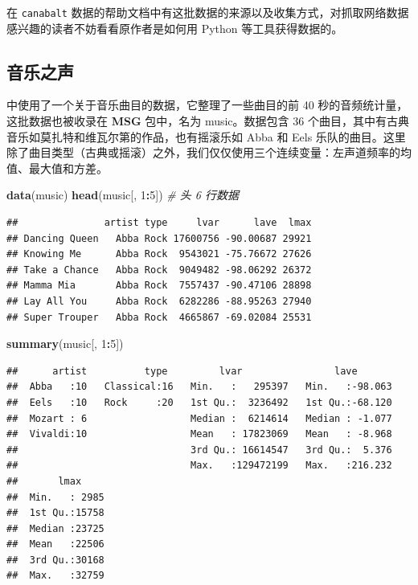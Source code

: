 \documentclass[
  b5paper,
  UTF8,twoside]{book}
\newenvironment{Shaded}{\begin{snugshade}}{\end{snugshade}}
\newcommand{\CommentTok}[1]{\textcolor[rgb]{0.56,0.35,0.01}{\textit{#1}}}
\newcommand{\DecValTok}[1]{\textcolor[rgb]{0.00,0.00,0.81}{#1}}
\newcommand{\FunctionTok}[1]{\textcolor[rgb]{0.13,0.29,0.53}{\textbf{#1}}}
\newcommand{\NormalTok}[1]{#1}
\newcommand{\SpecialCharTok}[1]{\textcolor[rgb]{0.81,0.36,0.00}{\textbf{#1}}}
\begin{document}
在 \texttt{canabalt} 数据的帮助文档中有这批数据的来源以及收集方式，对抓取网络数据感兴趣的读者不妨看看原作者是如何用 Python 等工具获得数据的。

\subsection{音乐之声}\label{subsec:music}

\citet{Cook07} 中使用了一个关于音乐曲目的数据，它整理了一些曲目的前 40 秒的音频统计量，这批数据也被收录在 \textbf{MSG} 包中，名为 music。数据包含 36 个曲目，其中有古典音乐如莫扎特和维瓦尔第的作品，也有摇滚乐如 Abba 和 Eels 乐队的曲目。这里除了曲目类型（古典或摇滚）之外，我们仅仅使用三个连续变量：左声道频率的均值、最大值和方差。

\begin{Shaded}
\begin{Highlighting}[]
\FunctionTok{data}\NormalTok{(music)}
\FunctionTok{head}\NormalTok{(music[, }\DecValTok{1}\SpecialCharTok{:}\DecValTok{5}\NormalTok{]) }\CommentTok{\# 头 6 行数据}
\end{Highlighting}
\end{Shaded}

\begin{verbatim}
##               artist type     lvar      lave  lmax
## Dancing Queen   Abba Rock 17600756 -90.00687 29921
## Knowing Me      Abba Rock  9543021 -75.76672 27626
## Take a Chance   Abba Rock  9049482 -98.06292 26372
## Mamma Mia       Abba Rock  7557437 -90.47106 28898
## Lay All You     Abba Rock  6282286 -88.95263 27940
## Super Trouper   Abba Rock  4665867 -69.02084 25531
\end{verbatim}

\begin{Shaded}
\begin{Highlighting}[]
\FunctionTok{summary}\NormalTok{(music[, }\DecValTok{1}\SpecialCharTok{:}\DecValTok{5}\NormalTok{])}
\end{Highlighting}
\end{Shaded}

\begin{verbatim}
##      artist          type         lvar                lave        
##  Abba   :10   Classical:16   Min.   :   295397   Min.   :-98.063  
##  Eels   :10   Rock     :20   1st Qu.:  3236492   1st Qu.:-68.120  
##  Mozart : 6                  Median :  6214614   Median : -1.077  
##  Vivaldi:10                  Mean   : 17823069   Mean   : -8.968  
##                              3rd Qu.: 16614547   3rd Qu.:  5.376  
##                              Max.   :129472199   Max.   :216.232  
##       lmax      
##  Min.   : 2985  
##  1st Qu.:15758  
##  Median :23725  
##  Mean   :22506  
##  3rd Qu.:30168  
##  Max.   :32759
\end{verbatim}
\end{document}
